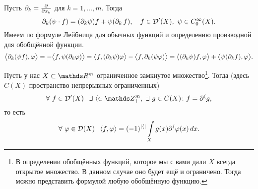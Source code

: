 \begin{Ut}
  Пусть $\partial_k = \frac{\partial  }{\partial x_k}$ для $k=1,\dots,m$. Тогда
\[
  \partial_k(\psi\cdot f) = (\partial_k\psi)f+\psi(\partial_k\,f),\quad f\in \mathcal D'(X),\ \psi\in C_0^\infty(X).
\]
  Имеем по формуле Лейбница для обычных функций и определению производной для обобщённой функции.
\[
  \big\langle \partial_k(\psi f),\varphi\big\rangle = -\big\langle f,\psi(\partial_k\varphi)\big\rangle = 
  \big\langle f,(\partial_k\psi)\varphi\big\rangle - \big\langle f,\partial_k(\psi\varphi)\big\rangle = 
  \big\langle(\partial_k\psi)f,\varphi\big\rangle + \big\langle\psi(\partial_kf),\varphi\big\rangle.
\]
\end{Ut}

\begin{The}
  Пусть у нас $X\subset \R^m$ ограниченное замкнутое множество\footnote{В определении обобщённых функций, которое мы с вами дали $X$ всегда открытое множество. В данном случае оно будет ещё и ограничено. Тогда можно представить формулой любую обобщённую функцию.}.
Тогда (здесь $C(X)$ пространство непрерывных ограниченных)
\[
  \forall\ f\in\D'(X)\pau \exists\ \a\in\Z_+^m,\ \exists\ g\in C(X)\colon f = \dl^\a g,
\]
то есть 
\[
  \forall\ \varphi\in\mathcal D(X)\hskip .75em plus.1em minus.08em\relax
  \langle f,\varphi\rangle = (-1)^{|\langle|}\int\limits_{X}g(x)\partial^\langle\varphi(x)\,dx.
\]
\end{The}
